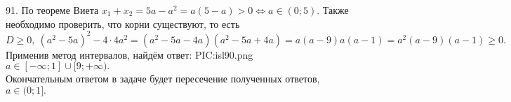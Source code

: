 91. По теореме Виета $x_1+x_2=5a-a^2=a(5-a)>0\Leftrightarrow a\in(0;5).$ Также необходимо проверить, что корни существуют, то есть $D\geqslant0,\ (a^2-5a)^2-4\cdot4a^2=(a^2-5a-4a)(a^2-5a+4a)=a(a-9)a(a-1)=a^2(a-9)(a-1)\geqslant0.$ Применив метод интервалов, найдём ответ:
{{PIC:isl90.png}}
$a\in[-\infty;1]\cup[9;+\infty).$\\ Окончательным ответом в задаче будет пересечение полученных ответов, $a\in (0;1].$\\
